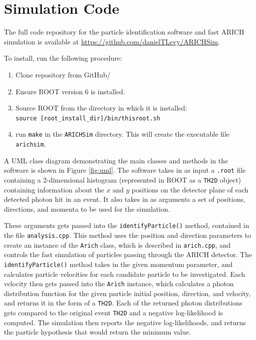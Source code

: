 
\chapter{Simulation Code}
\label{ch:simCode}

The full code repository for the particle identification software and fast ARICH simulation is available at \url{https://github.com/danielTLevy/ARICHSim}.

To install, run the following procedure:

\begin{enumerate}
\item Clone repository from GitHub/
\item Ensure ROOT version 6 is installed.
\item Source ROOT from the directory in which it is installed: \\ \verb!source [root_install_dir]/bin/thisroot.sh!
\item run \verb!make! in the \verb!ARICHSim! directory. This will create the executable file \verb!arichsim!.
\end{enumerate}

A UML class diagram demonstrating the main classes and methods in the software is shown in Figure \ref{fig:uml}. 
The software takes in as input a \verb!.root! file containing a 2-dimensional histogram (represented in ROOT as a \verb!TH2D! object) containing information about the $x$ and $y$ positions on the detector plane of each detected photon hit in an event.
It also takes in as arguments a set of positions, directions, and momenta to be used for the simulation.

These arguments gets passed into the \verb!identifyParticle()! method, contained in the file \verb!analysis.cpp!.
This method uses the position and direction parameters to create an instance of the \verb!Arich! class, which is described in \verb!arich.cpp!, and controls the fast simulation of particles passing through the ARICH detector.
The \verb!identifyParticle()! method takes in the given momentum parameter, and calculates particle velocities for each candidate particle to be investigated.
Each velocity then gets passed into the \verb!Arich! instance, which calculates a photon distribution function for the given particle initial position, direction, and velocity, and returns it in the form of a \verb!TH2D!.
Each of the returned photon distributions gets compared to the original event \verb!TH2D! and a negative log-likelihood is computed.
The simulation then reports the negative log-likelihoods, and returns the particle hypothesis that would return the minimum value.

